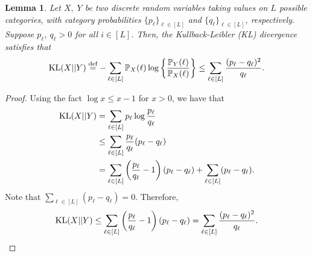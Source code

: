\documentclass[11pt]{article}
\theoremstyle{plain}
\newtheorem{lem}{Lemma}
\theoremstyle{definition}
\begin{document}
\begin{lem}\label{lem:KLentry} Let $X,\; Y$ be two discrete random variables taking values on $L$ possible categories, with category probabilities $\{p_\ell\}_{\ell\in[L]}$ and $\{q_\ell\}_{\ell\in[L]}$, respectively.  Suppose $p_\ell$, $q_\ell>0$ for all $i\in[L]$. Then, the Kullback-Leibler (KL) divergence satisfies that
\[
\mathrm{KL}(X||Y)\stackrel{\text{def}}{=}-\sum_{\ell\in[L]}\mathbb{P}_X(\ell)\log\left\{{\mathbb{P}_Y(\ell)\over \mathbb{P}_X(\ell)}\right\} \leq \sum_{\ell \in [L]}{(p_\ell-q_\ell)^2 \over q_\ell}.
\]
\end{lem}
\begin{proof} Using the fact $\log x\leq x-1$ for $x>0$, we have that
\begin{align}\label{eq:KL}
\text{KL}(X||Y)&=\sum_{\ell\in[L]}p_\ell\log{p_\ell\over q_\ell}\\
&\leq \sum_{\ell\in[L]} {p_\ell\over q_\ell}(p_\ell-q_\ell)\\
&=\sum_{\ell\in[L]} \left({p_\ell\over q_\ell }- 1\right)(p_\ell-q_\ell)+ \sum_{\ell\in[L]} (p_\ell-q_\ell).
\end{align}
Note that $\sum_{\ell\in[L]}(p_\ell-q_\ell)=0$. Therefore,
\[
\text{KL}(X||Y)\leq \sum_{\ell\in[L]}\left( {p_\ell\over q_\ell}-1\right)\left(p_\ell-q_\ell\right)=\sum_{\ell\in[L]}{(p_\ell-q_\ell)^2\over q_\ell}.
\]
\end{proof}
\end{document}
